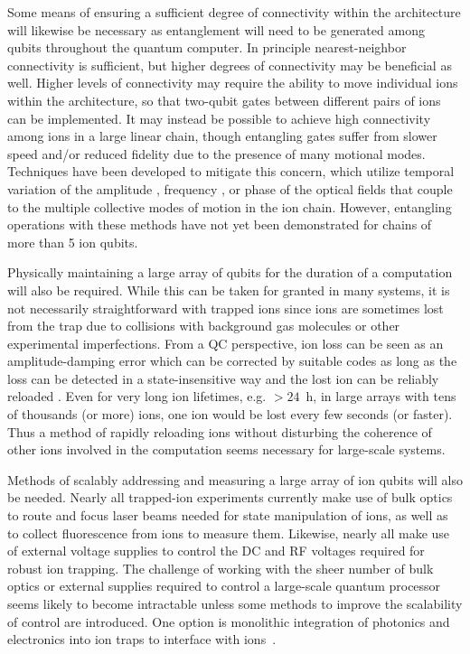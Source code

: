 \documentclass[%
12pt,
 amsmath,amssymb,
]{revtex4-2}
\begin{document}
Some means of ensuring a sufficient degree of connectivity within the architecture will likewise be necessary as entanglement will need to be generated among qubits throughout the quantum computer.  In principle nearest-neighbor connectivity is sufficient, but higher degrees of connectivity may be beneficial as well. Higher levels of connectivity may require the ability to move individual ions within the architecture, so that two-qubit gates between different pairs of ions can be implemented. It may instead be possible to achieve high connectivity among ions in a large linear chain, though entangling gates suffer from slower speed and/or reduced fidelity due to the presence of many motional modes.  Techniques have been developed to mitigate this concern, which utilize temporal variation of the amplitude \cite{ChoiMultimodeIonControl2014}, frequency \cite{LeungFreqMod2QGate2018}, or phase \cite{milne2018phase} of the optical fields that couple to the multiple collective modes of motion in the ion chain.  However, entangling operations with these methods have not yet been demonstrated for chains of more than 5 ion qubits.

Physically maintaining a large array of qubits for the duration of a computation will also be required.  While this can be taken for granted in many systems, it is not necessarily straightforward with trapped ions since ions are sometimes lost from the trap due to collisions with background gas molecules or other experimental imperfections. From a QC perspective, ion loss can be seen as an amplitude-damping error which can be corrected by suitable codes as long as the loss can be detected in a state-insensitive way and the lost ion can be reliably reloaded \cite{ValaAtomLossCorrection2005}. Even for very long ion lifetimes, e.g. $> 24$~h, in large arrays with tens of thousands (or more) ions, one ion would be lost every few seconds (or faster). Thus a method of rapidly reloading ions without disturbing the coherence of other ions involved in the computation \cite{Bruzewicz2016} seems necessary for large-scale systems.

Methods of scalably addressing and measuring a large array of ion qubits will also be needed. Nearly all trapped-ion experiments currently make use of bulk optics to route and focus laser beams needed for state manipulation of ions, as well as to collect fluorescence from ions to measure them.  Likewise, nearly all make use of external voltage supplies to control the DC and RF voltages required for robust ion trapping. The challenge of working with the sheer number of bulk optics or external supplies required to control a large-scale quantum processor seems likely to become intractable unless some methods to improve the scalability of control are introduced. One option is monolithic integration of photonics and electronics into ion traps to interface with ions~\cite{MehtaIntegrated2016, StuartDACTRap2018}.
\end{document}
